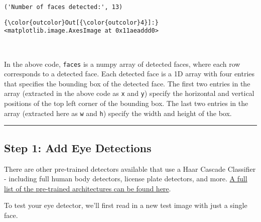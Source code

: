 \documentclass[11pt]{article}
\begin{document}
    \begin{Verbatim}[commandchars=\\\{\}]
('Number of faces detected:', 13)

    \end{Verbatim}

\begin{Verbatim}[commandchars=\\\{\}]
{\color{outcolor}Out[{\color{outcolor}4}]:} <matplotlib.image.AxesImage at 0x11aeaddd0>
\end{Verbatim}
            
    \begin{center}
    \end{center}
    { \hspace*{\fill} \\}
    
    In the above code, \texttt{faces} is a numpy array of detected faces,
where each row corresponds to a detected face. Each detected face is a
1D array with four entries that specifies the bounding box of the
detected face. The first two entries in the array (extracted in the
above code as \texttt{x} and \texttt{y}) specify the horizontal and
vertical positions of the top left corner of the bounding box. The last
two entries in the array (extracted here as \texttt{w} and \texttt{h})
specify the width and height of the box.

    \begin{center}\rule{0.5\linewidth}{\linethickness}\end{center}

\subsection{Step 1: Add Eye Detections}\label{step-1-add-eye-detections}

There are other pre-trained detectors available that use a Haar Cascade
Classifier - including full human body detectors, license plate
detectors, and more.
\href{https://github.com/opencv/opencv/tree/master/data/haarcascades}{A
full list of the pre-trained architectures can be found here}.

    To test your eye detector, we'll first read in a new test image with
just a single face.
\end{document}

